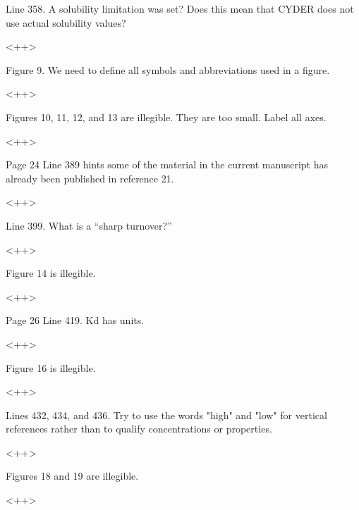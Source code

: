 \documentclass[answers,12pt]{exam}
\begin{document}
\begin{questions}
 

\question Line 358. A solubility limitation was set? Does this mean that CYDER does not use actual solubility values?
\begin{solution}
<++>
\end{solution}

 

\question Figure 9. We need to define all symbols and abbreviations used in a figure.
\begin{solution}
<++>
\end{solution}

 

\question Figures 10, 11, 12, and 13 are illegible. They are too small. Label all axes.
\begin{solution}
<++>
\end{solution}

 

\question Page 24 Line 389 hints some of the material in the current manuscript has already been published in reference 21.
\begin{solution}
<++>
\end{solution}

 

\question Line 399. What is a “sharp turnover?”
\begin{solution}
<++>
\end{solution}

 

\question Figure 14 is illegible.
\begin{solution}
<++>
\end{solution}

 

\question Page 26 Line 419. Kd has units.
\begin{solution}
<++>
\end{solution}

 

\question Figure 16 is illegible.
\begin{solution}
<++>
\end{solution}

 

\question Lines 432, 434, and 436. Try to use the words "high" and "low" for vertical references rather than to qualify concentrations or properties.
\begin{solution}
<++>
\end{solution}

 

\question Figures 18 and 19 are illegible.
\begin{solution}
<++>
\end{solution}


\end{questions}
\end{document}

